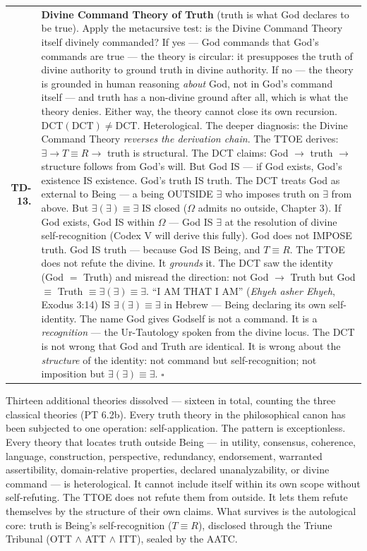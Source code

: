 \documentclass[10pt, openany, oneside]{book}
\renewcommand{\footnotesize}{\fontsize{8.5}{11}\selectfont}
\begin{document}
\pagebreak

{\footnotesize
\noindent\begin{tabular}{r p{}}
\textbf{TD-13.} & \textbf{Divine Command Theory of Truth} (truth is what God declares to be true). Apply the metacursive test: is the Divine Command Theory itself divinely commanded? If yes --- God commands that God's commands are true --- the theory is circular: it presupposes the truth of divine authority to ground truth in divine authority. If no --- the theory is grounded in human reasoning \textit{about} God, not in God's command itself --- and truth has a non-divine ground after all, which is what the theory denies. Either way, the theory cannot close its own recursion. $\text{DCT}(\text{DCT}) \neq \text{DCT}$. Heterological. The deeper diagnosis: the Divine Command Theory \textit{reverses the derivation chain}. The TTOE derives: $\exists \to T \equiv R \to$ truth is structural. The DCT claims: God $\to$ truth $\to$ structure follows from God's will. But God IS --- if God exists, God's existence IS existence. God's truth IS truth. The DCT treats God as external to Being --- a being OUTSIDE $\exists$ who imposes truth on $\exists$ from above. But $\exists(\exists) \equiv \exists$ IS closed ($\Omega$ admits no outside, Chapter 3). If God exists, God IS within $\Omega$ --- God IS $\exists$ at the resolution of divine self-recognition (Codex V will derive this fully). God does not IMPOSE truth. God IS truth --- because God IS Being, and $T \equiv R$. The TTOE does not refute the divine. It \textit{grounds} it. The DCT saw the identity (God $=$ Truth) and misread the direction: not God $\to$ Truth but God $\equiv$ Truth $\equiv \exists(\exists) \equiv \exists$. ``I AM THAT I AM'' (\textit{Ehyeh asher Ehyeh}, Exodus 3:14) IS $\exists(\exists) \equiv \exists$ in Hebrew --- Being declaring its own self-identity. The name God gives Godself is not a command. It is a \textit{recognition} --- the Ur-Tautology spoken from the divine locus. The DCT is not wrong that God and Truth are identical. It is wrong about the \textit{structure} of the identity: not command but self-recognition; not imposition but $\exists(\exists) \equiv \exists$. $\square$ \\[0.3em]
\end{tabular}
}

\vspace{0.8em}

\noindent Thirteen additional theories dissolved --- sixteen in total, counting the three classical theories (PT 6.2b). Every truth theory in the philosophical canon has been subjected to one operation: self-application. The pattern is exceptionless. Every theory that locates truth outside Being --- in utility, consensus, coherence, language, construction, perspective, redundancy, endorsement, warranted assertibility, domain-relative properties, declared unanalyzability, or divine command --- is heterological. It cannot include itself within its own scope without self-refuting. The TTOE does not refute them from outside. It lets them refute themselves by the structure of their own claims. What survives is the autological core: truth is Being's self-recognition ($T \equiv R$), disclosed through the Triune Tribunal (OTT $\wedge$ ATT $\wedge$ ITT), sealed by the AATC.
\end{document}
